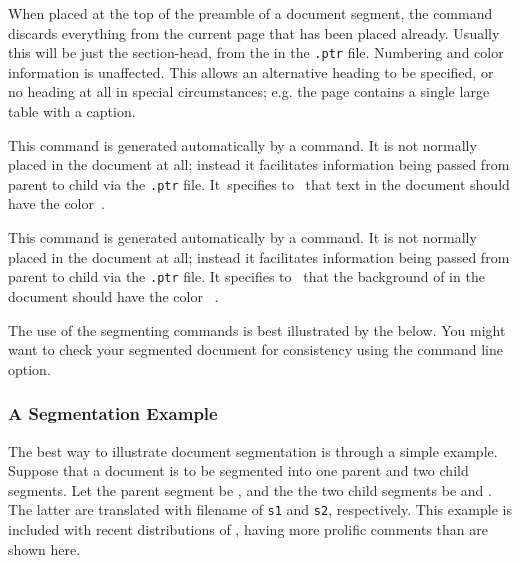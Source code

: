 \begin{htmllist}
%
\item [ \Lc{htmlnohead}\label{htmlnohead}] 
%
When placed at the top of the preamble of a document segment, the 
command discards everything from the current page that has been placed already.
Usually this will be just the section-head, from the  
in the \texttt{.ptr} file. Numbering and color information is unaffected.\html{\\}
This allows an alternative heading to be specified, or no heading at all in special
circumstances; e.g. the page contains a single large table with a caption.

%
\item [ \Lc{segmentcolor\char123}\Meta{model}%
 \texttt{\char125\char123}\Meta{color}\texttt{\char125}\label{segcolor}] 
%
This command is generated automatically by a  command. 
It is not normally placed in the document at all; instead it facilitates 
information being passed from parent to child 
via the \texttt{.ptr} file.\html{\\}  
It~specifies to \latextohtml\ that text in the document 
should have the color \,.

%
\item [ \Lc{segmentpagecolor\char123}\Meta{model}%
 \texttt{\char125\char123}\Meta{color}\texttt{\char125}\label{segpagecolor}] 
%
This command is generated automatically by a  command. 
It is not normally placed in the document at all; instead it facilitates 
information being passed from parent to child 
via the \texttt{.ptr} file.\html{\\}
It specifies to \latextohtml\ that the background of in the document 
should have the color ~.%
%
\end{htmllist}

The use of the segmenting commands is best illustrated by the
 below.
You might want to check your segmented document for consistency using
the  command line option.


\subsubsection{A Segmentation Example%
  \label{sec:segmentexample}}%
The best way to illustrate document segmentation 
is through a simple example.  
Suppose that a document is to be segmented into one parent 
and two child segments.  
Let the parent segment be , 
and the the two child segments be  and .  
The latter are translated with filename  of 
\texttt{s1} and \texttt{s2}, respectively.  
This example is included with recent distributions of \latextohtml, 
having more prolific comments than are shown here.

